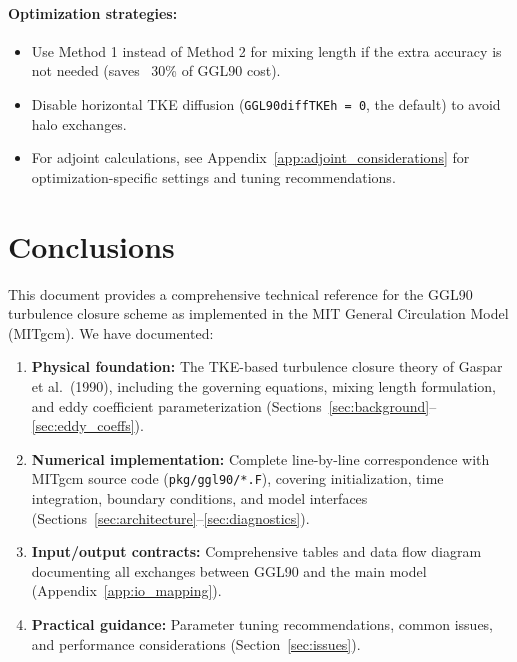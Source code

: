 \documentclass[12pt,letterpaper]{article}
\begin{document}
\paragraph{Optimization strategies:}
\begin{itemize}
\item Use Method 1 instead of Method 2 for mixing length if the extra accuracy is not needed (saves ~30\% of GGL90 cost).
\item Disable horizontal TKE diffusion (\verb|GGL90diffTKEh = 0|, the default) to avoid halo exchanges.
\item For adjoint calculations, see Appendix~\ref{app:adjoint_considerations} for optimization-specific settings and tuning recommendations.
\end{itemize}

\section{Conclusions}
\label{sec:conclusions}

This document provides a comprehensive technical reference for the GGL90 turbulence closure scheme as implemented in the MIT General Circulation Model (MITgcm). We have documented:

\begin{enumerate}
\item \textbf{Physical foundation:} The TKE-based turbulence closure theory of Gaspar et al.\ (1990), including the governing equations, mixing length formulation, and eddy coefficient parameterization (Sections~\ref{sec:background}--\ref{sec:eddy_coeffs}).

\item \textbf{Numerical implementation:} Complete line-by-line correspondence with MITgcm source code (\verb|pkg/ggl90/*.F|), covering initialization, time integration, boundary conditions, and model interfaces (Sections~\ref{sec:architecture}--\ref{sec:diagnostics}).

\item \textbf{Input/output contracts:} Comprehensive tables and data flow diagram documenting all exchanges between GGL90 and the main model (Appendix~\ref{app:io_mapping}).

\item \textbf{Practical guidance:} Parameter tuning recommendations, common issues, and performance considerations (Section~\ref{sec:issues}).
\end{enumerate}
\end{document}
